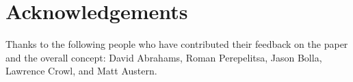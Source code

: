 \section{Acknowledgements}

Thanks to the following people who have contributed their feedback on the paper and the overall concept: David Abrahams, Roman Perepelitsa, Jason Bolla, Lawrence Crowl, and Matt Austern.